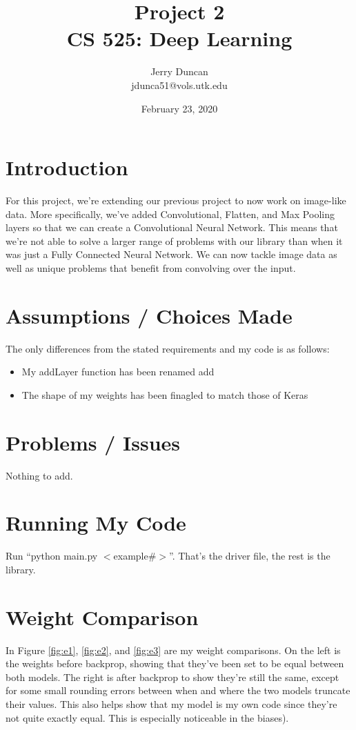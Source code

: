 \documentclass[12pt]{article}
\title{Project 2 \\\vspace{1em}
\large CS 525: Deep Learning}
\author{
  Jerry Duncan \\
  jdunca51@vols.utk.edu
}
\date{February 23, 2020}
\begin{document}
\maketitle
\pagebreak

\section{Introduction}

For this project, we're extending our previous project to now work on image-like data.
More specifically, we've added Convolutional, Flatten, and Max Pooling layers so that we can create a Convolutional Neural Network.
This means that we're not able to solve a larger range of problems with our library than when it was just a Fully Connected Neural Network.
We can now tackle image data as well as unique problems that benefit from convolving over the input.

\section{Assumptions / Choices Made}

The only differences from the stated requirements and my code is as follows:
\begin{itemize}
  \item My addLayer function has been renamed add
  \item The shape of my weights has been finagled to match those of Keras
\end{itemize}

\section{Problems / Issues}

Nothing to add.

\section{Running My Code}

Run ``python main.py $<$example\#$>$''. That's the driver file, the rest is the library.

\section{Weight Comparison}

In Figure \ref{fig:e1}, \ref{fig:e2}, and \ref{fig:e3} are my weight comparisons.
On the left is the weights before backprop, showing that they've been set to be equal between both models.
The right is after backprop to show they're still the same, except for some small rounding errors between when and where the two models truncate their values.
This also helps show that my model is my own code since they're not quite exactly equal.
 This is especially noticeable in the biases).
\end{document}
